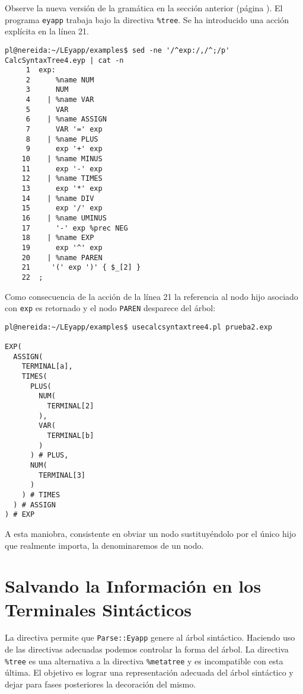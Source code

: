 Observe la nueva versión de la gramática en la sección anterior (página 
\pageref{code:treegeneration}). El programa \verb|eyapp| trabaja bajo la directiva 
\verb|%tree|. Se ha introducido una acción explícita en la línea 21.
\begin{verbatim}
pl@nereida:~/LEyapp/examples$ sed -ne '/^exp:/,/^;/p' CalcSyntaxTree4.eyp | cat -n
     1  exp:
     2      %name NUM
     3      NUM
     4    | %name VAR
     5      VAR
     6    | %name ASSIGN
     7      VAR '=' exp
     8    | %name PLUS
     9      exp '+' exp
    10    | %name MINUS
    11      exp '-' exp
    12    | %name TIMES
    13      exp '*' exp
    14    | %name DIV
    15      exp '/' exp
    16    | %name UMINUS
    17      '-' exp %prec NEG
    18    | %name EXP
    19      exp '^' exp
    20    | %name PAREN
    21     '(' exp ')' { $_[2] }
    22  ;
\end{verbatim}
Como consecuencia de la acción de la línea 21 la referencia al nodo hijo 
asociado con \verb|exp| es retornado y el nodo \verb|PAREN| desparece 
del árbol:
\begin{verbatim}
pl@nereida:~/LEyapp/examples$ usecalcsyntaxtree4.pl prueba2.exp

EXP(
  ASSIGN(
    TERMINAL[a],
    TIMES(
      PLUS(
        NUM(
          TERMINAL[2]
        ),
        VAR(
          TERMINAL[b]
        )
      ) # PLUS,
      NUM(
        TERMINAL[3]
      )
    ) # TIMES
  ) # ASSIGN
) # EXP
\end{verbatim}
A esta maniobra, consistente en obviar un nodo sustituyéndolo 
por el único hijo que realmente importa, la denominaremos 
de un nodo. 

\section{Salvando la Información en los Terminales Sintácticos}
\label{section:treedirective}

La directiva  permite que {\tt Parse::Eyapp}
genere al árbol sintáctico. Haciendo uso de las directivas
adecuadas podemos controlar la forma del árbol. La directiva
\verb|%tree| es una alternativa a la directiva \verb|%metatree|
y es incompatible con esta última. El objetivo es lograr
una representación adecuada del árbol sintáctico y dejar
para fases posteriores la decoración del mismo.

